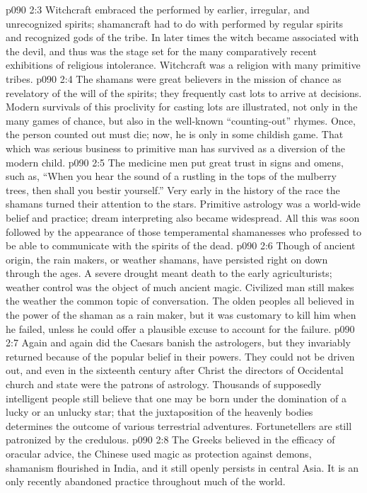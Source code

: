 \vs p090 2:3 Witchcraft embraced the  performed by earlier, irregular, and unrecognized spirits; shamancraft had to do with  performed by regular spirits and recognized gods of the tribe. In later times the witch became associated with the devil, and thus was the stage set for the many comparatively recent exhibitions of religious intolerance. Witchcraft was a religion with many primitive tribes.
\vs p090 2:4 The shamans were great believers in the mission of chance as revelatory of the will of the spirits; they frequently cast lots to arrive at decisions. Modern survivals of this proclivity for casting lots are illustrated, not only in the many games of chance, but also in the well\hyp{}known “counting\hyp{}out” rhymes. Once, the person counted out must die; now, he is only  in some childish game. That which was serious business to primitive man has survived as a diversion of the modern child.
\vs p090 2:5 The medicine men put great trust in signs and omens, such as, “When you hear the sound of a rustling in the tops of the mulberry trees, then shall you bestir yourself.” Very early in the history of the race the shamans turned their attention to the stars. Primitive astrology was a world\hyp{}wide belief and practice; dream interpreting also became widespread. All this was soon followed by the appearance of those temperamental shamanesses who professed to be able to communicate with the spirits of the dead.
\vs p090 2:6 Though of ancient origin, the rain makers, or weather shamans, have persisted right on down through the ages. A severe drought meant death to the early agriculturists; weather control was the object of much ancient magic. Civilized man still makes the weather the common topic of conversation. The olden peoples all believed in the power of the shaman as a rain maker, but it was customary to kill him when he failed, unless he could offer a plausible excuse to account for the failure.
\vs p090 2:7 Again and again did the Caesars banish the astrologers, but they invariably returned because of the popular belief in their powers. They could not be driven out, and even in the sixteenth century after Christ the directors of Occidental church and state were the patrons of astrology. Thousands of supposedly intelligent people still believe that one may be born under the domination of a lucky or an unlucky star; that the juxtaposition of the heavenly bodies determines the outcome of various terrestrial adventures. Fortunetellers are still patronized by the credulous.
\vs p090 2:8 The Greeks believed in the efficacy of oracular advice, the Chinese used magic as protection against demons, shamanism flourished in India, and it still openly persists in central Asia. It is an only recently abandoned practice throughout much of the world.
